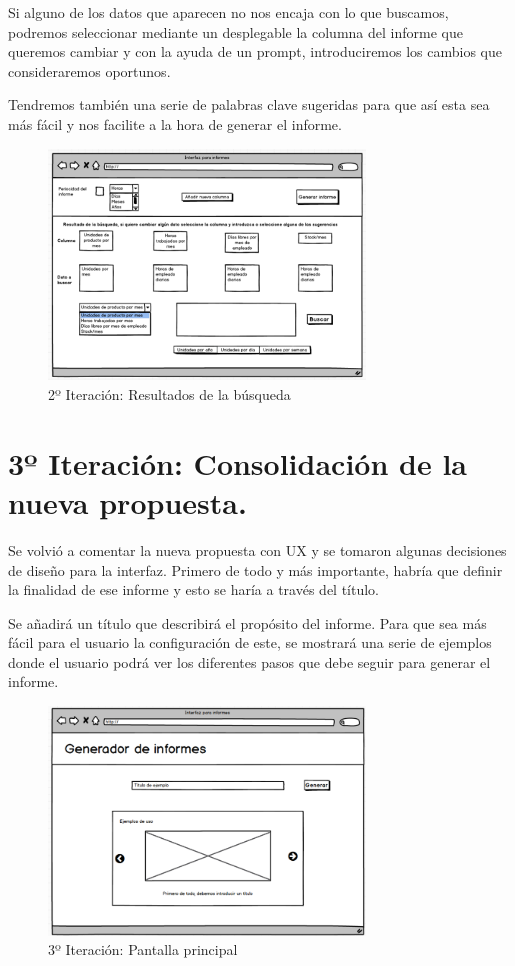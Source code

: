 Si alguno de los datos que aparecen no nos encaja con lo que buscamos, podremos seleccionar mediante un desplegable la columna del informe que queremos cambiar y con la ayuda de un prompt, introduciremos los cambios que consideraremos oportunos.

Tendremos también una serie de palabras clave sugeridas para que así esta sea más fácil y nos facilite a la hora de generar el informe.

\begin{figure}[hp!]
    \centering
    \includegraphics[width=0.75\textwidth]{imaxes/iteracion2.3.png}
    \caption{2º Iteración: Resultados de la búsqueda}
    \label{fig:iteracion2.3}
\end{figure}

\section{3º Iteración: Consolidación de la nueva propuesta.}

Se volvió a comentar la nueva propuesta con UX y se tomaron algunas decisiones de diseño para la interfaz. Primero de todo y más importante, habría que definir la finalidad de ese informe y esto se haría a través del título.

Se añadirá un título que describirá el propósito del informe. Para que sea más fácil para el usuario la configuración de este, se mostrará una serie de ejemplos donde el usuario podrá ver los diferentes pasos que debe seguir para generar el informe.

\begin{figure}[hp!]
    \centering
    \includegraphics[width=0.75\textwidth]{imaxes/iteracion3.1.png}
    \caption{3º Iteración: Pantalla principal}
    \label{fig:iteracion3.1}
\end{figure}

